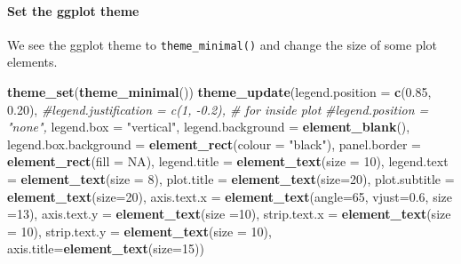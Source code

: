 \documentclass[
]{article}
\newenvironment{Shaded}{\begin{snugshade}}{\end{snugshade}}
\newcommand{\CommentTok}[1]{\textcolor[rgb]{0.56,0.35,0.01}{\textit{#1}}}
\newcommand{\DataTypeTok}[1]{\textcolor[rgb]{0.13,0.29,0.53}{#1}}
\newcommand{\DecValTok}[1]{\textcolor[rgb]{0.00,0.00,0.81}{#1}}
\newcommand{\FloatTok}[1]{\textcolor[rgb]{0.00,0.00,0.81}{#1}}
\newcommand{\KeywordTok}[1]{\textcolor[rgb]{0.13,0.29,0.53}{\textbf{#1}}}
\newcommand{\NormalTok}[1]{#1}
\newcommand{\OtherTok}[1]{\textcolor[rgb]{0.56,0.35,0.01}{#1}}
\newcommand{\StringTok}[1]{\textcolor[rgb]{0.31,0.60,0.02}{#1}}
\begin{document}
\hypertarget{set-the-ggplot-theme}{%
\paragraph{Set the ggplot theme}\label{set-the-ggplot-theme}}

We see the ggplot theme to \texttt{theme\_minimal()} and change the size
of some plot elements.

\begin{Shaded}
\begin{Highlighting}[]
\KeywordTok{theme_set}\NormalTok{(}\KeywordTok{theme_minimal}\NormalTok{())}
\KeywordTok{theme_update}\NormalTok{(}\DataTypeTok{legend.position =} \KeywordTok{c}\NormalTok{(}\FloatTok{0.85}\NormalTok{, }\FloatTok{0.20}\NormalTok{),}
             \CommentTok{#legend.justification = c(1, -0.2), # for inside plot}
             \CommentTok{#legend.position = "none",}
             \DataTypeTok{legend.box =} \StringTok{"vertical"}\NormalTok{,}
             \DataTypeTok{legend.background =} \KeywordTok{element_blank}\NormalTok{(),}
             \DataTypeTok{legend.box.background =} \KeywordTok{element_rect}\NormalTok{(}\DataTypeTok{colour =} \StringTok{"black"}\NormalTok{),}
             \DataTypeTok{panel.border =} \KeywordTok{element_rect}\NormalTok{(}\DataTypeTok{fill =} \OtherTok{NA}\NormalTok{),}
             \DataTypeTok{legend.title =} \KeywordTok{element_text}\NormalTok{(}\DataTypeTok{size =} \DecValTok{10}\NormalTok{),}
             \DataTypeTok{legend.text =} \KeywordTok{element_text}\NormalTok{(}\DataTypeTok{size =} \DecValTok{8}\NormalTok{),}
             \DataTypeTok{plot.title =} \KeywordTok{element_text}\NormalTok{(}\DataTypeTok{size=}\DecValTok{20}\NormalTok{),}
             \DataTypeTok{plot.subtitle =} \KeywordTok{element_text}\NormalTok{(}\DataTypeTok{size=}\DecValTok{20}\NormalTok{),}
             \DataTypeTok{axis.text.x =} \KeywordTok{element_text}\NormalTok{(}\DataTypeTok{angle=}\DecValTok{65}\NormalTok{, }\DataTypeTok{vjust=}\FloatTok{0.6}\NormalTok{, }\DataTypeTok{size =}\DecValTok{13}\NormalTok{),}
             \DataTypeTok{axis.text.y =} \KeywordTok{element_text}\NormalTok{(}\DataTypeTok{size =}\DecValTok{10}\NormalTok{),}
             \DataTypeTok{strip.text.x =} \KeywordTok{element_text}\NormalTok{(}\DataTypeTok{size =} \DecValTok{10}\NormalTok{),}
             \DataTypeTok{strip.text.y =} \KeywordTok{element_text}\NormalTok{(}\DataTypeTok{size =} \DecValTok{10}\NormalTok{),}
             \DataTypeTok{axis.title=}\KeywordTok{element_text}\NormalTok{(}\DataTypeTok{size=}\DecValTok{15}\NormalTok{))}
\end{Highlighting}
\end{Shaded}
\end{document}
